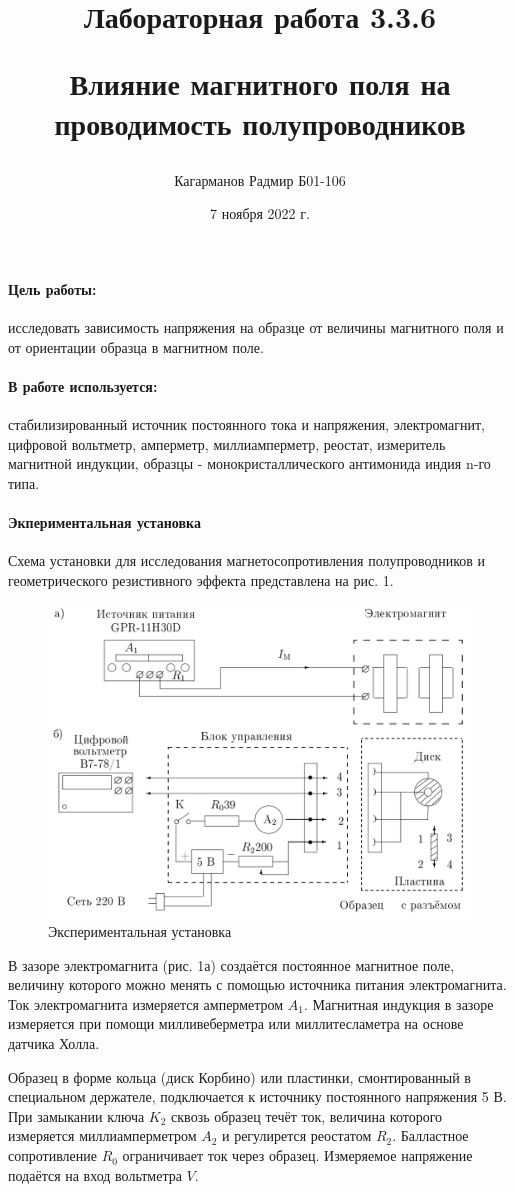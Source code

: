 \documentclass[a4paper,12pt]{article}
\title{Лабораторная работа 3.3.6 

Влияние магнитного поля на проводимость полупроводников}
\author{Кагарманов Радмир Б01-106}
\date{7 ноября 2022 г.}
\begin{document}
\maketitle
\thispagestyle{empty}
\newpage
\setcounter{page}{1}

\paragraph{Цель работы:} исследовать зависимость напряжения на образце от величины магнитного поля и от ориентации образца в магнитном поле.

\paragraph{В работе используется:} стабилизированный источник постоянного тока и напряжения, электромагнит, цифровой вольтметр, амперметр, миллиамперметр, реостат, измеритель магнитной индукции, образцы - монокристаллического антимонида индия n-го типа.

\paragraph{Экпериментальная установка\\}
Схема установки для исследования магнетосопротивления полупроводников и геометрического резистивного эффекта представлена на рис. 1.\par
\begin{figure}[!h]
\centering
\includegraphics[width=0.9\linewidth]{установка.png}
\caption{Экспериментальная установка}
\label{fig:mpr}
\end{figure}
В зазоре электромагнита (рис. 1а) создаётся постоянное магнитное поле, величину которого можно менять с помощью источника питания электромагнита. Ток электромагнита измеряется амперметром $A_1$. Магнитная индукция в зазоре измеряется при помощи милливеберметра или миллитесламетра на основе датчика Холла. \par
Образец в форме кольца (диск Корбино) или пластинки, смонтированный в специальном держателе, подключается к источнику постоянного напряжения 5 В. При замыкании ключа $K_2$ сквозь образец течёт ток, величина которого измеряется миллиамперметром $A_2$ и регулирется реостатом $R_2$. Балластное сопротивление $R_0$ ограничивает ток через образец. Измеряемое напряжение подаётся на вход вольтметра $V$. 
\newpage
\end{document}
